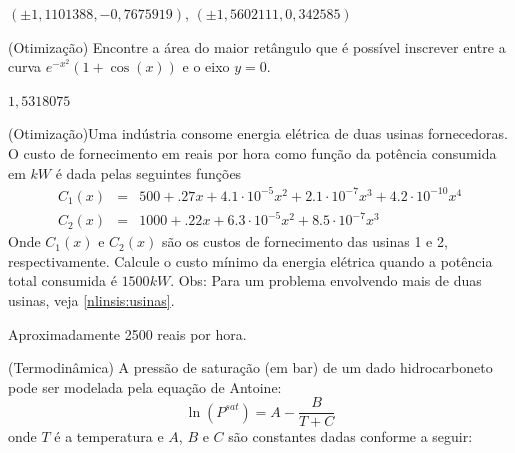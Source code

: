 \begin{ex}
\begin{resp}
$\left(\pm 1,1101388, -0,7675919\right)$, $\left(\pm 1,5602111, 0,342585\right)$

\end{resp}

\begin{exer}(Otimização) Encontre a área do maior retângulo que é possível inscrever entre a curva $e^{-x^2}\left(1+\cos(x)\right)$ e o eixo $y=0$.
\end{exer}
\begin{resp}

$1,5318075$

\end{resp}


\begin{exer}(Otimização)\label{1d:usinas}Uma indústria consome energia elétrica de duas usinas fornecedoras. O custo de fornecimento em reais por hora como função da potência consumida em $kW$ é dada pelas seguintes funções
\begin{eqnarray}
C_1(x)&=& 500+.27 x + 4.1\cdot 10^{-5}x^2 +2.1\cdot 10^{-7}x^3+4.2\cdot 10^{-10}x^4 \\
C_2(x)&=& 1000+.22 x + 6.3\cdot 10^{-5}x^2 +8.5\cdot 10^{-7}x^3
\end{eqnarray}
Onde $C_1(x)$ e $C_2(x)$ são os custos de fornecimento das usinas 1 e 2, respectivamente. Calcule o custo mínimo da energia elétrica quando a potência total consumida é  $1500kW$. Obs: Para um problema envolvendo mais de duas usinas, veja \ref{nlinsis:usinas}.
\end{exer}
\begin{resp}

 Aproximadamente 2500 reais por hora.

\end{resp}

\begin{exer}(Termodinâmica) A pressão de saturação (em bar) de um dado hidrocarboneto pode ser modelada pela equação de Antoine:
\begin{equation} \ln\left(P^{sat}\right)=A-\frac{B}{T+C} \end{equation}
onde $T$ é a temperatura e $A$, $B$ e $C$ são constantes dadas conforme a seguir:


\end{exer}
\end{ex}

